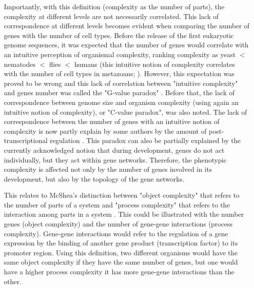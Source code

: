 Importantly, with this definition (complexity as the number of parts), the complexity at different levels are not necessarily correlated.
%
This lack of correspondence at different levels becomes evident when comparing the number of genes with the number of cell types. Before the release of the first eukaryotic genome sequences, it was expected that the number of genes would correlate with an intuitive perception of organismal complexity, ranking complexity as yeast $<$ nematodes $<$ flies $<$ humans \citep{Hahn2002} (this intuitive notion of complexity correlates with the number of cell types in metazoans; \citealp{Valentine1994}). However, this expectation was proved to be wrong and this lack of correlation between "intuitive complexity" and genes number was called the "G-value paradox" \citep{Hahn2002}.
Before that, the lack of correspondence between genome size and organism complexity (using again an intuitive notion of complexity),  or "C-value paradox", was also noted.
The lack of correspondence between the number of genes with an intuitive notion of complexity is now partly explain by some authors by the amount of post-transcriptional regulation \citep{Sempere2006}.
This paradox can also be partially explained by the currently acknowledged notion that during development, genes do not act individually, but they act within gene networks. Therefore, the phenotypic complexity is affected not only by the number of genes involved in its development, but also by the topology of the gene networks.

This relates to McShea's distinction between "object complexity" that refers to the number of parts of a system and "process complexity" that refers to the interaction among parts in a system \citep{McShea1996}.
This could be illustrated with the number genes (object complexity) and the number of gene-gene interactions (process complexity). Gene-gene interactions would refer to the regulation of a gene expression by the binding of another gene product (transcription factor) to its promoter region.
Using this definition, two different organisms would have the same object complexity if they have the same number of genes, but one would have a higher process complexity it has more gene-gene interactions than the other.


